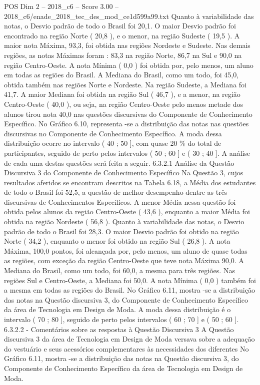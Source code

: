\begin{textsample}{POS Dim 2 – 2018\_c6 – Score 3.00 – 2018\_c6/enade\_2018\_tec\_des\_mod\_ce1d599a99.txt}
Quanto à variabilidade das notas, o Desvio padrão de todo o Brasil foi 20,1.
O maior Desvio padrão foi encontrado na região Norte ( 20,8 ), e o menor, na região Sudeste ( 19,5 ).
A maior nota Máxima, 93,3, foi obtida nas regiões Nordeste e Sudeste.
Nas demais regiões, as notas Máximas foram : 83,3 na região Norte, 86,7 na Sul e 90,0 na região Centro-Oeste.
A nota Mínima ( 0,0 ) foi obtida por, pelo menos, um aluno em todas as regiões do Brasil.
A Mediana do Brasil, como um todo, foi 45,0, obtida também nas regiões Norte e Nordeste.
Na região Sudeste, a Mediana foi 41,7.
A maior Mediana foi obtida na região Sul ( 46,7 ), e a menor, na região Centro-Oeste ( 40,0 ), ou seja, na região Centro-Oeste pelo menos metade dos alunos tirou nota 40,0 nas questões discursivas do Componente de Conhecimento Específico.
No Gráfico 6.10, representa -se a distribuição das notas nas questões discursivas no Componente de Conhecimento Específico.
A moda dessa distribuição ocorre no intervalo ( 40 ; 50 ], com quase 20 \% do total de participantes, seguido de perto pelos intervalos ( 50 ; 60 ] e ( 30 ; 40 ].
A análise de cada uma destas questões será feita a seguir. 6.3.2.1 Análise da Questão Discursiva 3 do Componente de Conhecimento Específico Na Questão 3, cujos resultados aferidos se encontram descritos na Tabela 6.18, a Média dos estudantes de todo o Brasil foi 52,5, a questão de melhor desempenho dentre as três discursivas de Conhecimentos Específicos.
A menor Média nessa questão foi obtida pelos alunos da região Centro-Oeste ( 43,6 ), enquanto a maior Média foi obtida na região Nordeste ( 56,8 ).
Quanto à variabilidade das notas, o Desvio padrão de todo o Brasil foi 28,3.
O maior Desvio padrão foi obtido na região Norte ( 34,2 ), enquanto o menor foi obtido na região Sul ( 26,8 ).
A nota Máxima, 100,0 pontos, foi alcançada por, pelo menos, um aluno de quase todas as regiões, com exceção da região Centro-Oeste que teve nota Máxima 90,0.
A Mediana do Brasil, como um todo, foi 60,0, a mesma para três regiões.
Nas regiões Sul e Centro-Oeste, a Mediana foi 50,0.
A nota Mínima ( 0,0 ) também foi a mesma em todas as regiões do Brasil.
No Gráfico 6.11, mostra -se a distribuição das notas na Questão discursiva 3, do Componente de Conhecimento Específico da área de Tecnologia em Design de Moda.
A moda dessa distribuição é o intervalo ( 70 ; 80 ], seguido de perto pelos intervalos ( 60 ; 70 ] e ( 50 ; 60 ]. 6.3.2.2 - Comentários sobre as respostas à Questão Discursiva 3 A Questão discursiva 3 da área de Tecnologia em Design de Moda versava sobre a adequação do vestuário e seus acessórios complementares às necessidades dos diferentes No Gráfico 6.11, mostra -se a distribuição das notas na Questão discursiva 3, do Componente de Conhecimento Específico da área de Tecnologia em Design de Moda.

\end{textsample}
